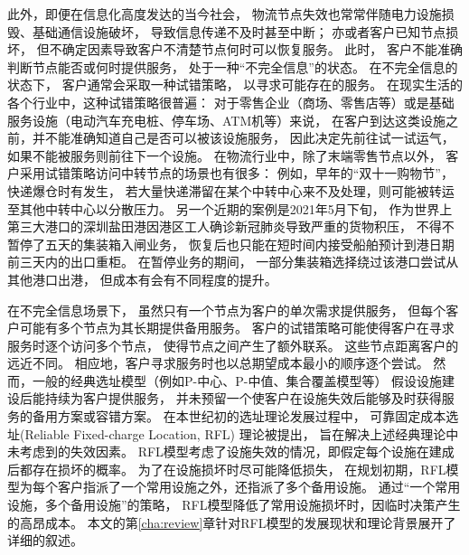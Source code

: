 此外，即便在信息化高度发达的当今社会，
物流节点失效也常常伴随电力设施损毁、基础通信设施破坏，
导致信息传递不及时甚至中断；
亦或者客户已知节点损坏，
但不确定因素导致客户不清楚节点何时可以恢复服务。
此时，
客户不能准确判断节点能否或何时提供服务，
处于一种``不完全信息''的状态。
在不完全信息的状态下，
客户通常会采取一种试错策略，
以寻求可能存在的服务。
在现实生活的各个行业中，这种试错策略很普遍：
对于零售企业（商场、零售店等）或是基础服务设施（电动汽车充电桩、停车场、ATM机等）来说，
在客户到达这类设施之前，并不能准确知道自己是否可以被该设施服务，
因此决定先前往试一试运气，如果不能被服务则前往下一个设施。
在物流行业中，除了末端零售节点以外，
客户采用试错策略访问中转节点的场景也有很多：
例如，早年的``双十一购物节''，快递爆仓时有发生，
若大量快递滞留在某个中转中心来不及处理，则可能被转运至其他中转中心以分散压力。
另一个近期的案例是2021年5月下旬，
作为世界上第三大港口的深圳盐田港因港区工人确诊新冠肺炎导致严重的货物积压，
不得不暂停了五天的集装箱入闸业务，
恢复后也只能在短时间内接受船舶预计到港日期前三天内的出口重柜\cite{盐田港}。
在暂停业务的期间，
一部分集装箱选择绕过该港口尝试从其他港口出港，
但成本有会有不同程度的提升。

在不完全信息场景下，
虽然只有一个节点为客户的单次需求提供服务，
但每个客户可能有多个节点为其长期提供备用服务。
客户的试错策略可能使得客户在寻求服务时逐个访问多个节点，
使得节点之间产生了额外联系。
这些节点距离客户的远近不同。
相应地，客户寻求服务时也以总期望成本最小的顺序逐个尝试。
然而，一般的经典选址模型（例如P-中心、P-中值、集合覆盖模型等）
假设设施建设后能持续为客户提供服务，
并未预留一个使客户在设施失效后能够及时获得服务的备用方案或容错方案。
在本世纪初的选址理论发展过程中，
可靠固定成本选址(Reliable Fixed-charge Location, RFL)
理论被提出\cite{Snyder2005}，
旨在解决上述经典理论中未考虑到的失效因素。
RFL模型考虑了设施失效的情况，即假定每个设施在建成后都存在损坏的概率。
为了在设施损坏时尽可能降低损失，
在规划初期，RFL模型为每个客户指派了一个常用设施之外，还指派了多个备用设施。
通过``一个常用设施，多个备用设施''的策略，
RFL模型降低了常用设施损坏时，因临时决策产生的高昂成本。
本文的第\ref{cha:review}章针对RFL模型的发展现状和理论背景展开了详细的叙述。

